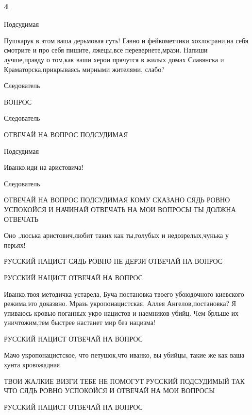 
 
 
 
 

\subsubsection{4}

Подсудимая 

Пушкарук в этом ваша дерьмовая суть! Гавно и фейкометчики хохлосрани,на себя
смотрите и про себя пишите, лжецы,все перевернете,мрази. Напиши лучше,правду о
том,как ваши херои прячутся в жилых домах Славянска и Краматорска,прикрываясь
мирными жителями, слабо?

Следователь

ВОПРОС

Следователь

ОТВЕЧАЙ НА ВОПРОС ПОДСУДИМАЯ

Подсудимая 

Иванко,иди на аристовича!

Следователь

ОТВЕЧАЙ НА ВОПРОС ПОДСУДИМАЯ КОМУ СКАЗАНО СЯДЬ РОВНО УСПОКОЙСЯ И НАЧИНАЙ
ОТВЕЧАТЬ НА МОИ ВОПРОСЫ ТЫ ДОЛЖНА ОТВЕЧАТЬ

\qqPodsudimyj

Оно ,люська аристович,любит таких как ты,голубых и недозрелых,чунька у перьях!

\qqSledovatel

РУССКИЙ НАЦИСТ СЯДЬ РОВНО НЕ ДЕРЗИ ОТВЕЧАЙ НА ВОПРОС

\qqSledovatel

РУССКИЙ НАЦИСТ ОТВЕЧАЙ НА ВОПРОС

\qqSledovatel

\qqSudVopros

\qqPodsudimyj

Иванко,твоя методичка устарела, Буча постановка твоего убоюдочного киевского
режима,это доказвно. Мразь укропонацистская, Аллея Ангелов,постановка? Я
упиваюсь кровью поганных укро нацистов и наемников убийц. Чем брльше их
уничтожим,тем быстрее настанет мир без нацизма!

\qqSledovatel

РУССКИЙ НАЦИСТ ОТВЕЧАЙ НА ВОПРОС

\qqSledovatel

\qqSudVopros

\qqPodsudimyj

Мачо укропонацистское, что петушок,что иванко, вы убийцы, такие же как ваша
хунта кровожадная

\qqSledovatel

ТВОИ ЖАЛКИЕ ВИЗГИ ТЕБЕ НЕ ПОМОГУТ РУССКИЙ ПОДСУДИМЫЙ ТАК ЧТО СЯДЬ РОВНО
УСПОКОЙСЯ И ОТВЕЧАЙ НА МОИ ВОПРОСЫ

\qqSledovatel

РУССКИЙ НАЦИСТ ОТВЕЧАЙ НА ВОПРОС

\qqSledovatel

\qqSudVopros
